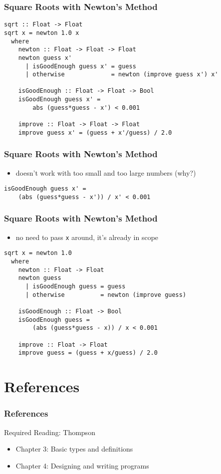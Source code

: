 \documentclass[dvipsnames]{beamer}
\theoremstyle{plain}
\begin{document}
\begin{frame}[fragile]
  \frametitle{Square Roots with Newton's Method}

  \begin{lstlisting}
sqrt :: Float -> Float
sqrt x = newton 1.0 x
  where
    newton :: Float -> Float -> Float
    newton guess x'
      | isGoodEnough guess x' = guess
      | otherwise             = newton (improve guess x') x'

    isGoodEnough :: Float -> Float -> Bool
    isGoodEnough guess x' =
        abs (guess*guess - x') < 0.001

    improve :: Float -> Float -> Float
    improve guess x' = (guess + x'/guess) / 2.0
  \end{lstlisting}
\end{frame}

\begin{frame}[fragile]
  \frametitle{Square Roots with Newton's Method}

  \begin{itemize}
    \item doesn't work with too small and too large numbers (why?)
  \end{itemize}

  \begin{lstlisting}
isGoodEnough guess x' =
    (abs (guess*guess - x')) / x' < 0.001
  \end{lstlisting}
\end{frame}

\begin{frame}[fragile]
  \frametitle{Square Roots with Newton's Method}

  \begin{itemize}
    \item no need to pass \lstinline|x| around, it's already in scope
  \end{itemize}

  \begin{lstlisting}
sqrt x = newton 1.0
  where
    newton :: Float -> Float
    newton guess
      | isGoodEnough guess = guess
      | otherwise          = newton (improve guess)

    isGoodEnough :: Float -> Bool
    isGoodEnough guess =
        (abs (guess*guess - x)) / x < 0.001

    improve :: Float -> Float
    improve guess = (guess + x/guess) / 2.0
  \end{lstlisting}
\end{frame}

\section*{References}

\begin{frame}
  \frametitle{References}

  \begin{block}{Required Reading: Thompson}
    \begin{itemize}
      \item Chapter 3: \alert{Basic types and definitions}
      \item Chapter 4: \alert{Designing and writing programs}
    \end{itemize}
  \end{block}
\end{frame}
\end{document}
